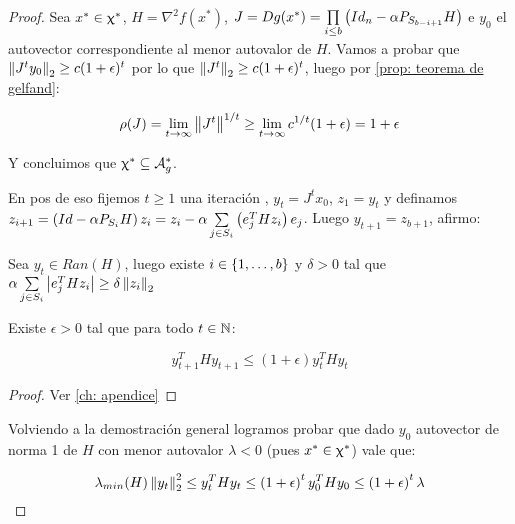 \begin{proof}
	Sea $x^* \in \upchi^*$, $H = \nabla^2 f(x^*)$, 
	$J=Dg(x^*) = \prod\limits_{i \leq b}{\left(Id_n - \alpha P_{S_{b-i+1}}H\right)}$ e $y_0$ el autovector correspondiente al menor autovalor de $H$. Vamos a probar que $\left\lVert J^t y_0\right\rVert_2 \geq c(1+\epsilon)^t$ por lo que $\left\lVert J^t\right\rVert _2 \geq  c(1+\epsilon)^t$, luego por \ref{prop: teorema de gelfand}:
	
	\begin{equation*}
	\rho(J) = \lim\limits_{t \rightarrow \infty}{\left\lVert J^t\right\rVert^{1/t}} \geq \lim\limits_{t \rightarrow \infty}{c^{1/t} (1+\epsilon)} = 1 + \epsilon 
	\end{equation*}
	
	Y concluimos que $\upchi^* \subseteq \mathcal{A}_{g}^{*}$.
	
	En pos de eso fijemos $t \geq 1$ una iteraci\'on , $y_t = J^t x_0$, $z_1 = y_t$ y definamos $z_{i+1} = \left(Id - \alpha P_{S_i}H\right)z_i = z_i - \alpha \sum\limits_{j \in S_i}{\left(e_j^T H z_i\right)e_j}$. Luego $y_{t+1} = z_{b+1}$, afirmo:
	
	\begin{claim}
		\label{claim1: DC los puntos silla estrictos son fijos inestables}
		Sea $y_t \in Ran(H)$, luego existe $i \in \left\lbrace1, \dots, b\right\rbrace$ y $\delta > 0$ tal que $\alpha \sum\limits_{j \in S_i}{\left\lvert e_j^T H z_i\right\rvert} \geq \delta \left\lVert z_i\right\rVert_2$
	\end{claim}
	
	\begin{lemma}
		\label{lemma1 : DC los puntos silla estrictos son fijos inestables}
		Existe $\epsilon >0$ tal que para todo $t \in {\mathbb{N}}$:
		
		\begin{equation*}
		\label{eq_1: DC los puntos silla estrictos son fijos inestables}
		y_{t+1}^THy_{t+1} \leq (1+\epsilon) y_{t}^THy_{t} 
		\end{equation*}
		
	\end{lemma}
	
	\begin{proof}
		Ver \ref{ch: apendice}
	\end{proof}

	Volviendo a la demostraci\'on general logramos probar que dado $y_0$ autovector de norma 1 de $H$ con menor autovalor $\lambda < 0$ (pues $x^* \in \upchi^*$) vale que:
	
	\begin{equation*}
		\lambda_{min}(H) \left\lVert y_t\right\rVert_2^2 \leq y_{t}^THy_{t} \leq \left(1+ \epsilon\right)^t y_{0}^THy_{0} \leq \left(1+ \epsilon\right)^t\lambda
	\end{equation*}


\end{proof}
